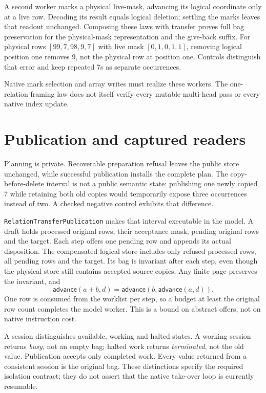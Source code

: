 \documentclass[11pt,a4paper]{article}
\newcommand{\code}[1]{\nolinkurl{#1}}
\begin{document}
A second worker marks a physical live-mask, advancing its logical coordinate
only at a live row. Decoding its result equals logical deletion; settling the
marks leaves that readout unchanged. Composing these laws with transfer proves
full bag preservation for the physical-mask representation and the give-back
suffix. For physical rows $[99,7,98,9,7]$ with live mask
$[0,1,0,1,1]$, removing logical position one removes 9, not the physical row
at position one. Controls distinguish that error and keep repeated 7s as
separate occurrences.

Native mark selection and array writes must realize these workers. The
one-relation framing law does not itself verify every mutable multi-head
pass or every native index update.

\section{Publication and captured readers}

Planning is private. Recoverable preparation refusal leaves the public
store unchanged, while successful publication installs the complete plan.
The copy-before-delete interval is not a public semantic state: publishing
one newly copied 7 while retaining both old copies would temporarily expose
three occurrences instead of two. A checked negative control exhibits that
difference.

\code{RelationTransferPublication} makes that interval executable in the
model. A draft holds processed original rows, their acceptance mask, pending
original rows and the target. Each step offers one pending row and appends
its actual disposition. The compensated logical store includes only refused
processed rows, all pending rows and the target. Its bag is invariant after
each step, even though the physical store still contains accepted source
copies. Any finite page preserves the invariant, and
\[
 \mathsf{advance}(a+b,d)=
 \mathsf{advance}(b,\mathsf{advance}(a,d)).
\]
One row is consumed from the worklist per step, so a budget at least the
original row count completes the model worker. This is a bound on abstract
offers, not on native instruction cost.

A session distinguishes available, working and halted states. A working
session returns \emph{busy}, not an empty bag; halted work returns
\emph{terminated}, not the old value. Publication accepts only completed
work. Every value returned from a consistent session is the original bag.
These distinctions specify the required isolation contract; they do not
assert that the native take-over loop is currently resumable.
\end{document}
